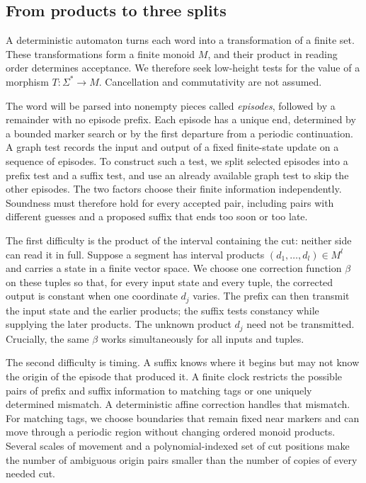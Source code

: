 \subsection{From products to three splits}

A deterministic automaton turns each word into a transformation of a finite
set. These transformations form a finite monoid $M$, and their product in
reading order determines acceptance. We therefore seek low-height tests
for the value of a morphism $T:\Sigma^*\to M$. Cancellation and
commutativity are not assumed.

The word will be parsed into nonempty pieces called \emph{episodes},
followed by a remainder with no episode prefix. Each episode has a unique
end, determined by a bounded marker search or by the first departure from
a periodic continuation. A graph test records the input and output of a
fixed finite-state update on a sequence of episodes. To construct such a
test, we split selected episodes into a prefix test and a suffix test,
and use an already available graph test to skip the other episodes. The
two factors choose their finite information independently. Soundness must
therefore hold for every accepted pair, including pairs with different
guesses and a proposed suffix that ends too soon or too late.

The first difficulty is the product of the interval containing the cut:
neither side can read it in full. Suppose a segment has interval products
$(d_1,\ldots,d_l)\in M^l$ and carries a state in a finite vector space.
We choose one correction function $\beta$ on these tuples so that, for
every input state and every tuple, the corrected output is constant when
one coordinate $d_j$ varies. The prefix can then transmit the input state
and the earlier products; the suffix tests constancy while supplying the
later products. The unknown product $d_j$ need not be transmitted. Crucially,
the same $\beta$ works simultaneously for all inputs and tuples.

The second difficulty is timing. A suffix knows where it begins but may
not know the origin of the episode that produced it. A finite clock
restricts the possible pairs of prefix and suffix information to matching
tags or one uniquely determined mismatch. A deterministic affine
correction handles that mismatch. For matching tags, we choose boundaries
that remain fixed near markers and can move through a periodic region
without changing ordered monoid products. Several scales of movement and
a polynomial-indexed set of cut positions make the number of ambiguous
origin pairs smaller than the number of copies of every needed cut.

